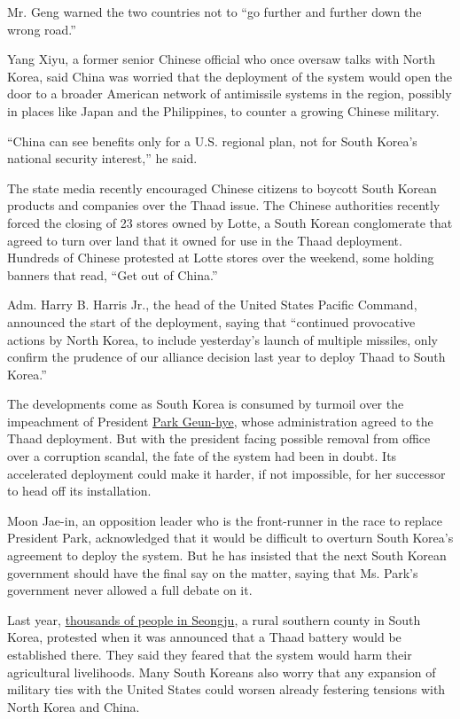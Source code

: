 Mr. Geng warned the two countries not to ``go further and further down
the wrong road.''

Yang Xiyu, a former senior Chinese official who once oversaw talks with
North Korea, said China was worried that the deployment of the system
would open the door to a broader American network of antimissile systems
in the region, possibly in places like Japan and the Philippines, to
counter a growing Chinese military.

``China can see benefits only for a U.S. regional plan, not for South
Korea's national security interest,'' he said.

The state media recently encouraged Chinese citizens to boycott South
Korean products and companies over the Thaad issue. The Chinese
authorities recently forced the closing of 23 stores owned by Lotte, a
South Korean conglomerate that agreed to turn over land that it owned
for use in the Thaad deployment. Hundreds of Chinese protested at Lotte
stores over the weekend, some holding banners that read, ``Get out of
China.''

Adm. Harry B. Harris Jr., the head of the United States Pacific Command,
announced the start of the deployment, saying that ``continued
provocative actions by North Korea, to include yesterday's launch of
multiple missiles, only confirm the prudence of our alliance decision
last year to deploy Thaad to South Korea.''

The developments come as South Korea is consumed by turmoil over the
impeachment of President
\href{http://topics.nytimes.com/top/reference/timestopics/people/p/park_geunhye/index.html?inline=nyt-per}{Park
Geun-hye}, whose administration agreed to the Thaad deployment. But with
the president facing possible removal from office over a corruption
scandal, the fate of the system had been in doubt. Its accelerated
deployment could make it harder, if not impossible, for her successor to
head off its installation.

Moon Jae-in, an opposition leader who is the front-runner in the race to
replace President Park, acknowledged that it would be difficult to
overturn South Korea's agreement to deploy the system. But he has
insisted that the next South Korean government should have the final say
on the matter, saying that Ms. Park's government never allowed a full
debate on it.

Last year,
\href{https://www.nytimes.com/2016/07/14/world/asia/south-korea-thaad-us.html}{thousands
of people in Seongju}, a rural southern county in South Korea, protested
when it was announced that a Thaad battery would be established there.
They said they feared that the system would harm their agricultural
livelihoods. Many South Koreans also worry that any expansion of
military ties with the United States could worsen already festering
tensions with North Korea and China.

